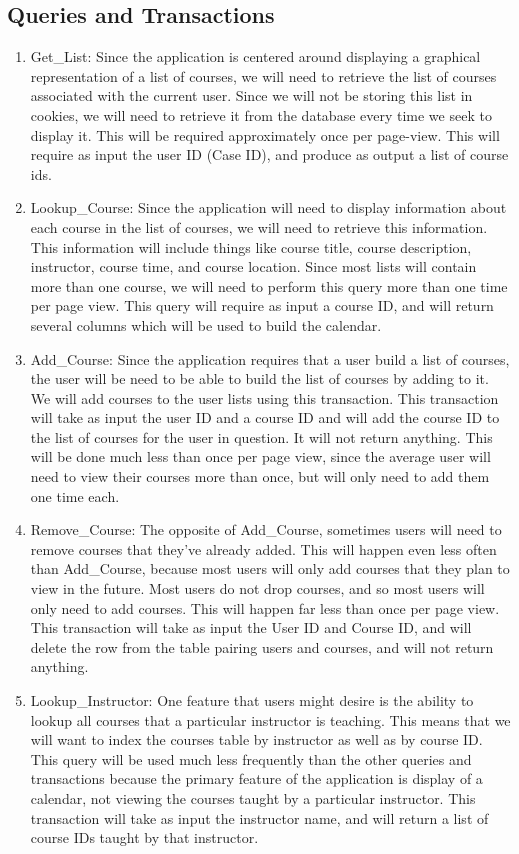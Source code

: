 \documentclass[pdftex,12pt,letter]{article}
\begin{document}
\subsection{Queries and Transactions}
\begin{enumerate}[1.]
\item Get\_List:  Since the application is centered around displaying a graphical representation of a list of courses, we will need to retrieve the list of courses associated with the current user.  Since we will not be storing this list in cookies, we will need to retrieve it from the database every time we seek to display it.  This will be required approximately once per page-view.  This will require as input the user ID (Case ID), and produce as output a list of course ids.
\item Lookup\_Course:  Since the application will need to display information about each course in the list of courses, we will need to retrieve this information.  This information will include things like course title, course description, instructor, course time, and course location.  Since most lists will contain more than one course, we will need to perform this query more than one time per page view.  This query will require as input a course ID, and will return several columns which will be used to build the calendar.
\item Add\_Course:  Since the application requires that a user build a list of courses, the user will be need to be able to build the list of courses by adding to it.  We will add courses to the user lists using this transaction.  This transaction will take as input the user ID and a course ID and will add the course ID to the list of courses for the user in question.  It will not return anything.  This will be done much less than once per page view, since the average user will need to view their courses more than once, but will only need to add them one time each.
\item Remove\_Course:  The opposite of Add\_Course, sometimes users will need to remove courses that they've already added.  This will happen even less often than Add\_Course, because most users will only add courses that they plan to view in the future.  Most users do not drop courses, and so most users will only need to add courses.  This will happen far less than once per page view.  This transaction will take as input the User ID and Course ID, and will delete the row from the table pairing users and courses, and will not return anything.
\item Lookup\_Instructor:  One feature that users might desire is the ability to lookup all courses that a particular instructor is teaching.  This means that we will want to index the courses table by instructor as well as by course ID.  This query will be used much less frequently than the other queries and transactions because the primary feature of the application is display of a calendar, not viewing the courses taught by a particular instructor.  This transaction will take as input the instructor name, and will return a list of course IDs taught by that instructor.

\end{enumerate}
\end{document}
